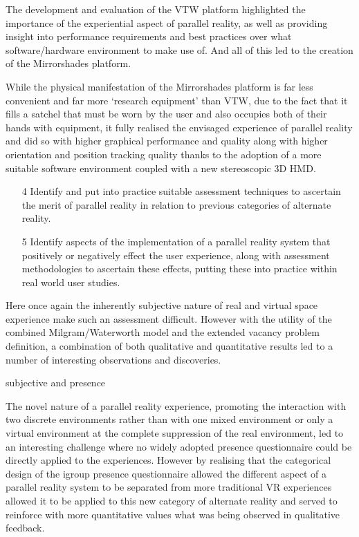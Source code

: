 The development and evaluation of the VTW platform highlighted the importance of the experiential aspect of parallel reality, as well as providing insight into performance requirements and best practices over what software/hardware environment to make use of. And all of this led to the creation of the Mirrorshades platform.

While the physical manifestation of the Mirrorshades platform is far less convenient and far more `research equipment' than VTW, due to the fact that it fills a satchel that must be worn by the user and also occupies both of their hands with equipment, it fully realised the envisaged experience of parallel reality and did so with higher graphical performance and quality along with higher orientation and position tracking quality thanks to the adoption of a more suitable software environment coupled with a new stereoscopic 3D HMD.

\begin{enumerate}	
	\item[4] Identify and put into practice suitable assessment techniques to ascertain the merit of parallel reality in relation to previous categories of alternate reality.
	\item[5] Identify aspects of the implementation of a parallel reality system that positively or negatively effect the user experience, along with assessment methodologies to ascertain these effects, putting these into practice within real world user studies.
\end{enumerate}

Here once again the inherently subjective nature of real and virtual space experience make such an assessment difficult. However with the utility of the combined Milgram/Waterworth model and the extended vacancy problem definition, a combination of both qualitative and quantitative results led to a number of interesting observations and discoveries.

subjective and presence

The novel nature of a parallel reality experience, promoting the interaction with two discrete environments rather than with one mixed environment or only a virtual environment at the complete suppression of the real environment, led to an interesting challenge where no widely adopted presence questionnaire could be directly applied to the experiences. However by realising that the categorical design of the igroup presence questionnaire allowed the different aspect of a parallel reality system to be separated from more traditional VR experiences allowed it to be applied to this new category of alternate reality and served to reinforce with more quantitative values what was being observed in qualitative feedback.

